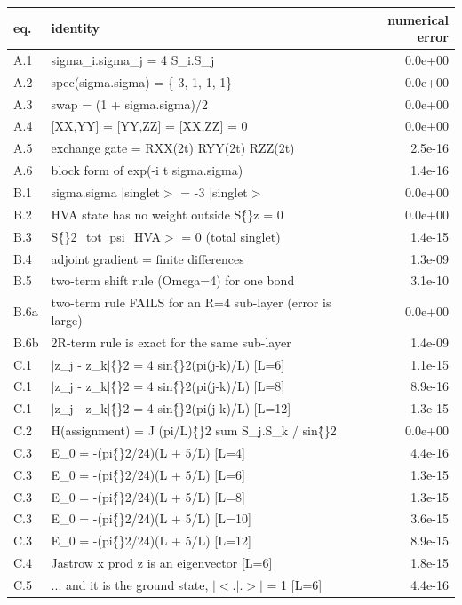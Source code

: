 \begin{tabular}{l p{10.4cm} r}
\toprule
eq. & identity & numerical error \\
\midrule
A.1 & sigma\_i.sigma\_j = 4 S\_i.S\_j & 0.0e+00 \\
A.2 & spec(sigma.sigma) = \{-3, 1, 1, 1\} & 0.0e+00 \\
A.3 & swap = (1 + sigma.sigma)/2 & 0.0e+00 \\
A.4 & [XX,YY] = [YY,ZZ] = [XX,ZZ] = 0 & 0.0e+00 \\
A.5 & exchange gate = RXX(2t) RYY(2t) RZZ(2t) & 2.5e-16 \\
A.6 & block form of exp(-i t sigma.sigma) & 1.4e-16 \\
B.1 & sigma.sigma $|$singlet$>$ = -3 $|$singlet$>$ & 0.0e+00 \\
B.2 & HVA state has no weight outside S\^\{\}z = 0 & 0.0e+00 \\
B.3 & S\^\{\}2\_tot $|$psi\_HVA$>$ = 0 (total singlet) & 1.4e-15 \\
B.4 & adjoint gradient = finite differences & 1.3e-09 \\
B.5 & two-term shift rule (Omega=4) for one bond & 3.1e-10 \\
B.6a & two-term rule FAILS for an R=4 sub-layer (error is large) & 0.0e+00 \\
B.6b & 2R-term rule is exact for the same sub-layer & 1.4e-09 \\
C.1 & $|$z\_j - z\_k$|$\^\{\}2 = 4 sin\^\{\}2(pi(j-k)/L)   [L=6] & 1.1e-15 \\
C.1 & $|$z\_j - z\_k$|$\^\{\}2 = 4 sin\^\{\}2(pi(j-k)/L)   [L=8] & 8.9e-16 \\
C.1 & $|$z\_j - z\_k$|$\^\{\}2 = 4 sin\^\{\}2(pi(j-k)/L)   [L=12] & 1.3e-15 \\
C.2 & H(assignment) = J (pi/L)\^\{\}2 sum S\_j.S\_k / sin\^\{\}2 & 0.0e+00 \\
C.3 & E\_0 = -(pi\^\{\}2/24)(L + 5/L)   [L=4] & 4.4e-16 \\
C.3 & E\_0 = -(pi\^\{\}2/24)(L + 5/L)   [L=6] & 1.3e-15 \\
C.3 & E\_0 = -(pi\^\{\}2/24)(L + 5/L)   [L=8] & 1.3e-15 \\
C.3 & E\_0 = -(pi\^\{\}2/24)(L + 5/L)   [L=10] & 3.6e-15 \\
C.3 & E\_0 = -(pi\^\{\}2/24)(L + 5/L)   [L=12] & 8.9e-15 \\
C.4 & Jastrow x prod z is an eigenvector   [L=6] & 1.8e-15 \\
C.5 & ... and it is the ground state, $|$$<$.$|$.$>$$|$ = 1   [L=6] & 4.4e-16 \\

\end{tabular}
